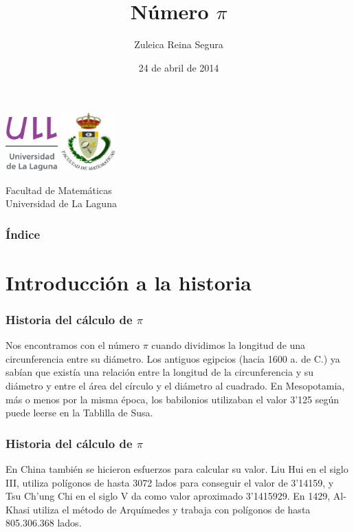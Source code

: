 \documentclass{beamer}
\title[Num $\pi$]{Número $\pi$}
\author[Zuleica Reina Segura]{Zuleica Reina Segura}
\institute{Fac. Mat.}
\date[24-04-2014]{24 de abril de 2014}
\begin{document}
\begin{frame}

  \includegraphics[width=0.15\textwidth]{img/ullesc.eps}
  \hspace*{7.5cm}
  \includegraphics[width=0.16\textwidth]{img/fmatesc.eps}
  \titlepage

  \begin{scriptsize}
    \begin{center}
     Facultad de Matemáticas \\
     Universidad de La Laguna
    \end{center}
  \end{scriptsize}

\end{frame}


\begin{frame}
  \frametitle{Índice}  
  \tableofcontents[pausesections]
\end{frame}
 
\section{Introducción a la historia}


\begin{frame}
\frametitle{Historia del cálculo de $\pi$}
Nos encontramos con el número $\pi$ cuando dividimos
la longitud de una circunferencia entre su diámetro.
Los antiguos egipcios (hacia 1600 a. de C.) ya sabían 
que existía una relación entre la longitud de la circunferencia 
y su diámetro y entre el área del círculo y el diámetro al cuadrado.
En Mesopotamia, más o menos por la misma época, los babilonios utilizaban
el valor 3'125 según puede leerse en la Tablilla de Susa. 
\end{frame}

\begin{frame}
\frametitle{Historia del cálculo de $\pi$}
En China también se hicieron esfuerzos para calcular su valor.
Liu Hui en el siglo III, utiliza polígonos de hasta 3072 lados
para conseguir el valor de 3'14159, y Tsu Ch'ung Chi en el siglo V 
da como valor aproximado 3'1415929.
En 1429, Al-Khasi utiliza el método de Arquímedes y trabaja 
con polígonos de hasta 805.306.368 lados.
\end{frame}
\end{document}
